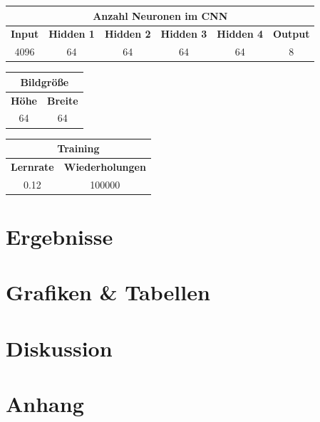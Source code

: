 \documentclass[paper=A4,pagesize=auto,12pt,headinclude=true,footinclude=true,BCOR=0mm,DIV=calc]{scrartcl}
\begin{document}
\begin{center}
	\begin{tabular}{|c|c|c|c|c|c|}
		\hline
		\multicolumn{6}{|c|}{\textbf{Anzahl Neuronen im CNN}}\\ \hline \hline
		\textbf{Input} & \textbf{Hidden 1} & \textbf{Hidden 2} & \textbf{Hidden 3} & \textbf{Hidden 4} & \textbf{Output}\\ \hline
		4096 & 64 & 64 & 64 & 64 & 8\\ \hline
	\end{tabular}
	\vspace{2em}
	\begin{tabular}{|c|c|}
		\hline
		\multicolumn{2}{|c|}{\textbf{Bildgröße}}\\ \hline \hline
		\textbf{Höhe} & \textbf{Breite}\\ \hline
		64 & 64\\ \hline
	\end{tabular}
	\vspace{2em}
	\begin{tabular}{|c|c|}
		\hline
		\multicolumn{2}{|c|}{\textbf{Training}}\\ \hline \hline
		\textbf{Lernrate} & \textbf{Wiederholungen}\\ \hline
		0.12 & 100000\\ \hline
	\end{tabular}
\end{center}



\section{Ergebnisse}


\section{Grafiken \& Tabellen}
\listoffigures
\listoftables

\section{Diskussion}


\printbibliography[heading=bibnumbered]


\section{Anhang}
\end{document}
